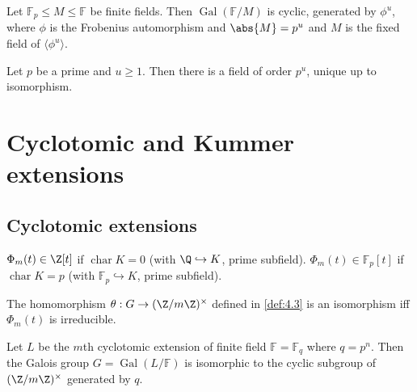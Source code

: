 \documentclass{article}
\DeclareMathOperator{\chara}{char}
\DeclareMathOperator{\Gal}{Gal}
\newcommand{\F}{\mathbb{F}}
\begin{document}
\begin{ncor}\label{cor:3.17}
    Let $\F_p \leq M \leq \F$ be finite fields.
    Then $\Gal(\F/M)$ is cyclic, generated by $\phi^u$, where $\phi$ is the Frobenius automorphism and $\abs{M} = p^u$ and $M$ is the fixed field of $\langle \phi^u \rangle$.
\end{ncor}

\begin{nthm}\label{thm:3.18}
    Let $p$ be a prime and $u \geq 1$.
    Then there is a field of order $p^u$, unique up to isomorphism.
\end{nthm}


\clearpage
\section{Cyclotomic and Kummer extensions}
\subsection{Cyclotomic extensions}
































\begin{nlemma}\label{lem:4.5}
    $\Phi_m(t) \in \Z[t]$ if $\chara K = 0$ (with $\Q \hookrightarrow K$, prime subfield).
    $\Phi_m(t) \in \F_p[t]$ if $\chara K = p$ (with $\F_p \hookrightarrow K$, prime subfield).
\end{nlemma}

\begin{nlemma}\label{lem:4.6}
    The homomorphism $\theta: G \to (\Z/m\Z)^\times$ defined in \cref{def:4.3} is an isomorphism iff $\Phi_m(t)$ is irreducible.
\end{nlemma}

\begin{nthm}\label{thm:4.7}
    Let $L$ be the $m$th cyclotomic extension of finite field $\F = \F_q$ where $q = p^n$.
    Then the Galois group $G = \Gal(L/\F)$ is isomorphic to the cyclic subgroup of $(\Z/m\Z)^\times$ generated by $q$.
\end{nthm}
\end{document}
